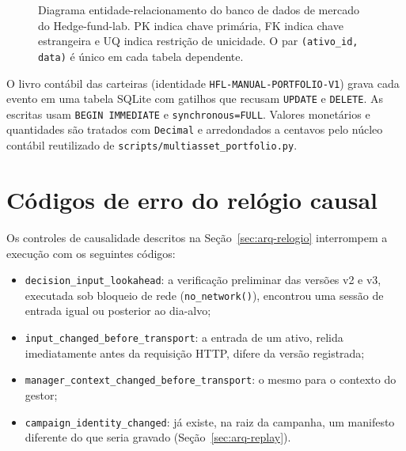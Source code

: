 \begin{figure}[htbp]
\caption{Diagrama entidade-relacionamento do banco de dados de mercado do Hedge-fund-lab. PK indica chave primária, FK indica chave estrangeira e UQ indica restrição de unicidade. O par \texttt{(ativo\_id, data)} é único em cada tabela dependente.}
\label{fig:hfl-der}
\end{figure}

O livro contábil das carteiras (identidade \texttt{HFL-MANUAL-PORTFOLIO-V1}) grava cada evento em uma tabela SQLite com gatilhos que recusam \texttt{UPDATE} e \texttt{DELETE}. As escritas usam \texttt{BEGIN IMMEDIATE} e \texttt{synchronous=FULL}. Valores monetários e quantidades são tratados com \texttt{Decimal} e arredondados a centavos pelo núcleo contábil reutilizado de \texttt{scripts/multiasset\_portfolio.py}.

\FloatBarrier
\section{Códigos de erro do relógio causal}

Os controles de causalidade descritos na Seção~\ref{sec:arq-relogio} interrompem a execução com os seguintes códigos:

\begin{itemize}
  \item \texttt{decision\_input\_lookahead}: a verificação preliminar das versões v2 e v3, executada sob bloqueio de rede (\texttt{no\_network()}), encontrou uma sessão de entrada igual ou posterior ao dia-alvo;
  \item \texttt{input\_changed\_before\_transport}: a entrada de um ativo, relida imediatamente antes da requisição HTTP, difere da versão registrada;
  \item \texttt{manager\_context\_changed\_before\_transport}: o mesmo para o contexto do gestor;
  \item \texttt{campaign\_identity\_changed}: já existe, na raiz da campanha, um manifesto diferente do que seria gravado (Seção~\ref{sec:arq-replay}).
\end{itemize}

